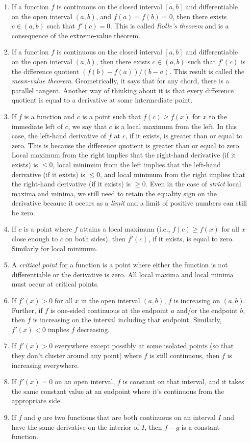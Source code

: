 \documentclass[10pt]{amsart}
\begin{document}
\begin{enumerate}
\item If a function $f$ is continuous on the closed interval $[a,b]$
  and differentiable on the open interval $(a,b)$, and $f(a) = f(b) =
  0$, then there exists $c \in (a,b)$ such that $f'(c) = 0$. This is
  called {\em Rolle's theorem} and is a consequence of the
  extreme-value theorem.
\item If a function $f$ is continuous on the closed interval $[a,b]$
  and differentiable on the open interval $(a,b)$, then there exists
  $c \in (a,b)$ such that $f'(c)$ is the difference quotient $(f(b) -
  f(a))/(b - a)$. This result is called the {\em mean-value
  theorem}. Geometrically, it says that for any chord, there is a
  parallel tangent. Another way of thinking about it is that every
  difference quotient is equal to a derivative at some intermediate
  point.
\item If $f$ is a function and $c$ is a point such that $f(c) \ge
  f(x)$ for $x$ to the immediate left of $c$, we say that $c$ is a
  local maximum from the left. In this case, the left-hand derivative
  of $f$ at $c$, if it exists, is greater than or equal to zero. This
  is because the difference quotient is greater than or equal to
  zero. Local maximum from the right implies that the right-hand
  derivative (if it exists) is $\le 0$, local minimum from the left
  implies that the left-hand derivative (if it exists) is $\le 0$, and
  local minimum from the right implies that the right-hand derivative
  (if it exists) is $\ge 0$. Even in the case of {\em strict} local
  maxima and minima, we still need to retain the equality sign on the
  derivative because it occurs as a {\em limit} and a limit of
  positive numbers can still be zero.
\item If $c$ is a point where $f$ attains a local maximum (i.e., $f(c)
  \ge f(x)$ for all $x$ close enough to $c$ on both sides), then
  $f'(c)$, if it exists, is equal to zero. Similarly for local
  minimum.
\item A {\em critical point} for a function is a point where either
  the function is not differentiable or the derivative is zero. All
  local maxima and local minima must occur at critical points.
\item If $f'(x) > 0$ for all $x$ in the open interval $(a,b)$, $f$ is
  increasing on $(a,b)$. Further, if $f$ is one-sided continuous at
  the endpoint $a$ and/or the endpoint $b$, then $f$ is increasing on
  the interval including that endpoint. Similarly, $f'(x) < 0$ implies
  $f$ decreasing.
\item If $f'(x) > 0$ everywhere except possibly at some isolated
  points (so that they don't cluster around any point) where $f$ is
  still continuous, then $f$ is increasing everywhere.
\item If $f'(x) = 0$ on an open interval, $f$ is constant on that
  interval, and it takes the same constant value at an endpoint where
  it's continuous from the appropriate side.
\item If $f$ and $g$ are two functions that are both continuous on an
  interval $I$ and have the same derivative on the interior of $I$,
  then $f - g$ is a constant function.


\end{enumerate}
\end{document}
